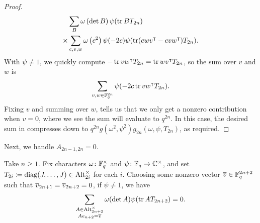 \begin{proof}
\begin{align*}
        & \sum_{B}\omega\left(\det B\right)\psi(\operatorname{tr} BT_{2n}) \\
        \times{} & \sum_{c,v,w}\omega\left(c^2\right)\psi(-2c)\psi(\operatorname{tr}(cwv^\intercal-cvw^\intercal)T_{2n}).
    \end{align*}
    With $\psi\ne1$, we quickly compute $-\operatorname{tr} vw^\intercal T_{2n}=\operatorname{tr} wv^\intercal T_{2n}$, so the sum over $v$ and $w$ is
    \[\sum_{v,w\in\mathbb F_q^{2n}}\psi(-2c\operatorname{tr} vw^\intercal T_{2n}).\]
    Fixing $v$ and summing over $w$,  tells us that we only get a nonzero contribution when $v=0$, where we see the sum will evaluate to $q^{2n}$. In this case, the desired sum in compresses down to $q^{2n}g\left(\omega^2,\psi^2\right)g_{2n}(\omega,\psi,T_{2n})$, as required.
\end{proof}
Next, we handle $A_{2n-1,2n}=0$.
\begin{lemma} \label{lem:gsum-alt-0}
    Take $n\ge1$. Fix characters $\omega\colon\mathbb F_q^\times$ and $\psi\colon\mathbb F_q\to\mathbb C^\times$, and set $T_{2i}\coloneqq\operatorname{diag}(J,\ldots,J)\in\operatorname{Alt}^\times_{2i}$ for each $i$. Choosing some nonzero vector $\overline{v}\in\mathbb F_q^{2n+2}$ such that $\overline{v}_{2n+1}=\overline{v}_{2n+2}=0$, if $\psi\ne1$, we have
    \[\sum_{\substack{A\in\operatorname{Alt}_{2n+2}^\times\\Ae_{n+2}=\overline{v}}}\omega(\det A)\psi(\operatorname{tr} AT_{2n+2})=0.
    \]
\end{lemma}
